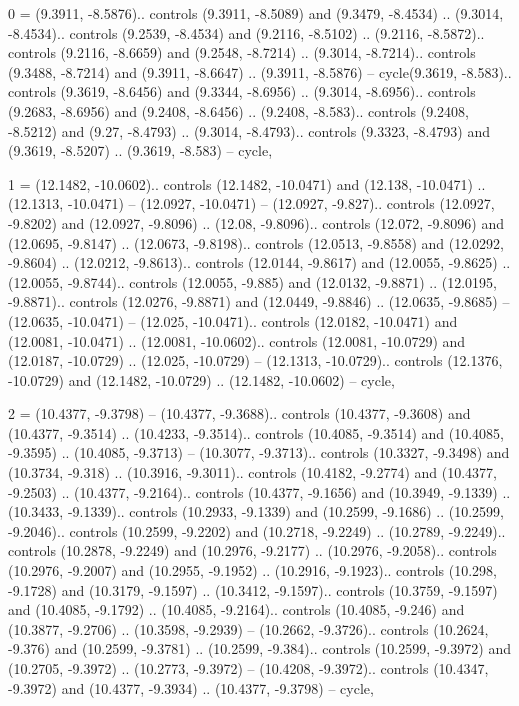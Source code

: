 0 = {(9.3911, -8.5876).. controls (9.3911, -8.5089) and (9.3479, -8.4534) .. (9.3014, -8.4534).. controls (9.2539, -8.4534) and (9.2116, -8.5102) .. (9.2116, -8.5872).. controls (9.2116, -8.6659) and (9.2548, -8.7214) .. (9.3014, -8.7214).. controls (9.3488, -8.7214) and (9.3911, -8.6647) .. (9.3911, -8.5876) -- cycle(9.3619, -8.583).. controls (9.3619, -8.6456) and (9.3344, -8.6956) .. (9.3014, -8.6956).. controls (9.2683, -8.6956) and (9.2408, -8.6456) .. (9.2408, -8.583).. controls (9.2408, -8.5212) and (9.27, -8.4793) .. (9.3014, -8.4793).. controls (9.3323, -8.4793) and (9.3619, -8.5207) .. (9.3619, -8.583) -- cycle},

1 = {(12.1482, -10.0602).. controls (12.1482, -10.0471) and (12.138, -10.0471) .. (12.1313, -10.0471) -- (12.0927, -10.0471) -- (12.0927, -9.827).. controls (12.0927, -9.8202) and (12.0927, -9.8096) .. (12.08, -9.8096).. controls (12.072, -9.8096) and (12.0695, -9.8147) .. (12.0673, -9.8198).. controls (12.0513, -9.8558) and (12.0292, -9.8604) .. (12.0212, -9.8613).. controls (12.0144, -9.8617) and (12.0055, -9.8625) .. (12.0055, -9.8744).. controls (12.0055, -9.885) and (12.0132, -9.8871) .. (12.0195, -9.8871).. controls (12.0276, -9.8871) and (12.0449, -9.8846) .. (12.0635, -9.8685) -- (12.0635, -10.0471) -- (12.025, -10.0471).. controls (12.0182, -10.0471) and (12.0081, -10.0471) .. (12.0081, -10.0602).. controls (12.0081, -10.0729) and (12.0187, -10.0729) .. (12.025, -10.0729) -- (12.1313, -10.0729).. controls (12.1376, -10.0729) and (12.1482, -10.0729) .. (12.1482, -10.0602) -- cycle},

2 = {(10.4377, -9.3798) -- (10.4377, -9.3688).. controls (10.4377, -9.3608) and (10.4377, -9.3514) .. (10.4233, -9.3514).. controls (10.4085, -9.3514) and (10.4085, -9.3595) .. (10.4085, -9.3713) -- (10.3077, -9.3713).. controls (10.3327, -9.3498) and (10.3734, -9.318) .. (10.3916, -9.3011).. controls (10.4182, -9.2774) and (10.4377, -9.2503) .. (10.4377, -9.2164).. controls (10.4377, -9.1656) and (10.3949, -9.1339) .. (10.3433, -9.1339).. controls (10.2933, -9.1339) and (10.2599, -9.1686) .. (10.2599, -9.2046).. controls (10.2599, -9.2202) and (10.2718, -9.2249) .. (10.2789, -9.2249).. controls (10.2878, -9.2249) and (10.2976, -9.2177) .. (10.2976, -9.2058).. controls (10.2976, -9.2007) and (10.2955, -9.1952) .. (10.2916, -9.1923).. controls (10.298, -9.1728) and (10.3179, -9.1597) .. (10.3412, -9.1597).. controls (10.3759, -9.1597) and (10.4085, -9.1792) .. (10.4085, -9.2164).. controls (10.4085, -9.246) and (10.3877, -9.2706) .. (10.3598, -9.2939) -- (10.2662, -9.3726).. controls (10.2624, -9.376) and (10.2599, -9.3781) .. (10.2599, -9.384).. controls (10.2599, -9.3972) and (10.2705, -9.3972) .. (10.2773, -9.3972) -- (10.4208, -9.3972).. controls (10.4347, -9.3972) and (10.4377, -9.3934) .. (10.4377, -9.3798) -- cycle},

